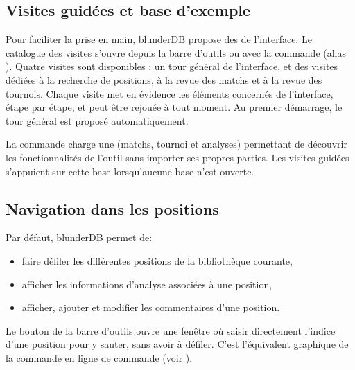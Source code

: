 \documentclass[letterpaper,10pt,french]{sphinxmanual}
\begin{document}
\subsection{Visites guidées et base d’exemple}
\label{\detokenize{manuel:visites-guidees-et-base-d-exemple}}\label{\detokenize{manuel:visites-guidees}}
\sphinxAtStartPar
Pour faciliter la prise en main, blunderDB propose des  de
l’interface. Le catalogue des visites s’ouvre depuis la barre d’outils ou avec
la commande  (alias ). Quatre visites sont disponibles : un
tour général de l’interface, et des visites dédiées à la recherche de positions,
à la revue des matchs et à la revue des tournois. Chaque visite met en évidence
les éléments concernés de l’interface, étape par étape, et peut être rejouée à
tout moment. Au premier démarrage, le tour général est proposé automatiquement.

\sphinxAtStartPar
La commande  charge une  (matchs, tournoi et analyses)
permettant de découvrir les fonctionnalités de l’outil sans importer ses propres
parties. Les visites guidées s’appuient sur cette base lorsqu’aucune base n’est
ouverte.


\subsection{Navigation dans les positions}
\label{\detokenize{manuel:navigation-dans-les-positions}}\label{\detokenize{manuel:navigation-positions}}
\sphinxAtStartPar
Par défaut, blunderDB permet de:
\begin{itemize}
\item {} 
\sphinxAtStartPar
faire défiler les différentes positions de la bibliothèque courante,

\item {} 
\sphinxAtStartPar
afficher les informations d’analyse associées à une position,

\item {} 
\sphinxAtStartPar
afficher, ajouter et modifier les commentaires d’une position.

\end{itemize}

\sphinxAtStartPar
Le bouton  de la barre d’outils ouvre une fenêtre où
saisir directement l’indice d’une position pour y sauter, sans avoir à
défiler. C’est l’équivalent graphique de la commande \sphinxcode{\sphinxupquote{{[}number{]}}} en ligne de
commande (voir {\hyperref[\detokenize{cmd_mode:cmd-positions}]{}}).
\end{document}
